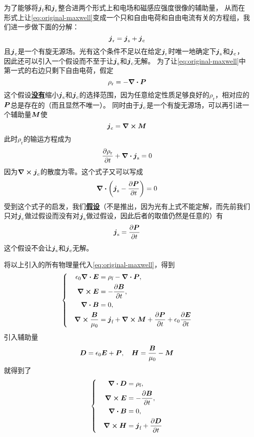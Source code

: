 \documentclass[UTF8, a4paper]{ctexart}
\newcommand*{\concept}[1]{\underline{\textbf{#1}}}
\newenvironment{bigcase}{\left\{\quad\begin{aligned}}{\end{aligned}\right.}
\begin{document}
为了能够将$\vb*{j}_\text{f}$和$\vb*{j}_\text{r}$整合进两个形式上和电场和磁感应强度很像的辅助量，
从而在形式上让\eqref{eq:original-maxwell}变成一个只和自由电荷和自由电流有关的方程组，我们进一步做下面的分解：
\[
    \vb*{j}_\text{r} = \vb*{j}_\text{s} + \vb*{j}_\text{c}
\]
且$\vb*{j}_\text{c}$是一个有旋无源场。光有这个条件不足以在给定$\vb*{j}_\text{r}$时唯一地确定下$\vb*{j}_\text{s}$和$\vb*{j}_\text{c}$，
因此还可以引入一个假设而不至于让$\vb*{j}_\text{s}$和$\vb*{j}_\text{c}$无解。
为了让\eqref{eq:original-maxwell}中第一式的右边只剩下自由电荷，假定
\[
    \rho_\text{r} = - \div{\vb*{P}}
\]
这个假设\concept{没有}缩小$\vb*{j}_\text{s}$和$\vb*{j}_\text{c}$的选择范围，因为任意给定性质足够良好的$\rho_\text{r}$，相对应的$\vb*{P}$总是存在的（而且显然不唯一）。
同时由于$\vb*{j}_\text{c}$是一个有旋无源场，可以再引进一个辅助量$\vb*{M}$使
\[
    \vb*{j}_\text{c} = \curl{\vb*{M}}
\]
此时$\rho_\text{r}$的输运方程成为
\[
    \pdv{\rho_\text{r}}{t} + \div{\vb*{j}_\text{s}} = 0
\]
因为$\curl{\vb*{j}_\text{c}}$的散度为零。这个式子又可以写成
\[
    \div{\left(\vb*{j}_\text{s}-\pdv{\vb*{P}}{t}\right)} = 0
\]
受到这个式子的启发，我们\concept{假设}（不是推出，因为光有上式不能定解，而先前我们只对$\vb*{j}_\text{c}$做过假设而没有对$\vb*{j}_\text{s}$做过假设，因此后者的取值仍然是任意的）有
\[
    \vb*{j}_\text{s} = \pdv{\vb*{P}}{t}
\]
这个假设不会让$\vb*{j}_\text{s}$和$\vb*{j}_\text{c}$无解。

将以上引入的所有物理量代入\eqref{eq:original-maxwell}，得到
\[
    \begin{bigcase}
        \epsilon_0 \div{\vb*{E}} &= \rho_\text{f} - \div{\vb*{P}}, \\
        \curl{\vb*{E}} &= - \pdv{\vb*{B}}{t}, \\
        \div{\vb*{B}} &= 0, \\
        \curl{\frac{\vb*{B}}{\mu_0}} &= \vb*{j}_\text{f} + \curl{\vb*{M}} + \pdv{\vb*{P}}{t} + \epsilon_0 \pdv{\vb*{E}}{t}
    \end{bigcase}
\]
引入辅助量
\[
    \vb*{D} = \epsilon_0 \vb*{E} + \vb*{P}, \quad \vb*{H} = \frac{\vb*{B}}{\mu_0} - \vb*{M}
\]
就得到了
\begin{equation}
    \begin{bigcase}
        \div{\vb*{D}} &= \rho_\text{f}, \\
        \curl{\vb*{E}} &= - \pdv{\vb*{B}}{t}, \\
        \div{\vb*{B}} &= 0, \\
        \curl{\vb*{H}} &= \vb*{j}_\text{f} + \pdv{\vb*{D}}{t}
    \end{bigcase}
    \label{eq:maxwell-material}
\end{equation}
\end{document}
